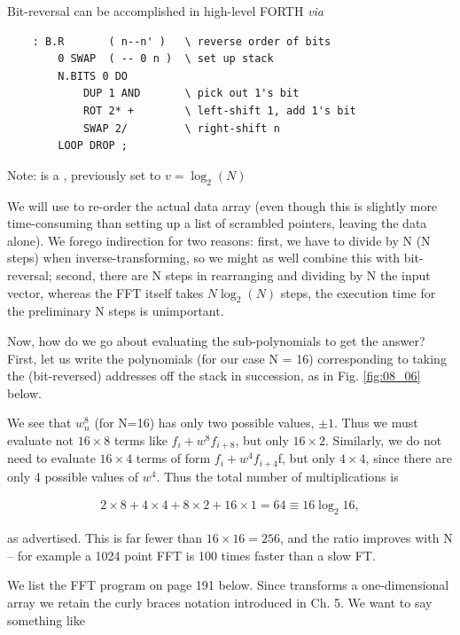 Bit-reversal can be accomplished in high-level FORTH \textit{via}

\begin{lstlisting}
    : B.R       ( n--n' )   \ reverse order of bits
        0 SWAP  ( -- 0 n )  \ set up stack
        N.BITS 0 DO
            DUP 1 AND       \ pick out 1's bit
            ROT 2* +        \ left-shift 1, add 1's bit
            SWAP 2/         \ right-shift n
        LOOP DROP ;
\end{lstlisting}

\leftbar[1\linewidth]
Note:  is a , previously set to $v = \log_{2}(N)$
\endleftbar

We will use  to re-order the actual data array (even though this is slightly more time-consuming than setting up a list of scrambled pointers, leaving the data alone). We forego indirection for two reasons: first, we have to divide by N (N steps) when inverse-transforming, so we might as well combine this with bit-reversal; second, there are N steps in rearranging and dividing by N the input vector, whereas the FFT itself takes $N\log_{2}(N)$ steps, \ie the execution time for the preliminary N steps is unimportant.

Now, how do we go about evaluating the sub-polynomials to get the answer? First, let us write the polynomials (for our case N = 16) corresponding to taking the (bit-reversed) addresses off the stack in succession, as in Fig. \ref{fig:08_06} below.



We see that $w_{n}^{8}$ (for N=16) has only two possible values, $\pm1$. Thus we must evaluate not $16\times8$ terms like $f_{i} + w^{8}f_{i+8}$, but only $16\times2$. Similarly, we do not need to evaluate $16\times4$ terms of form $f_{i} + w^{4}f_{i+4}$f, but only $4\times4$, since there are only 4 possible values of $w^{4}$. Thus the total number of multiplications is

\begin{align*}
    2\times8 + 4\times4 + 8\times2 + 16\times1 = 64 \equiv 16\log_{2}16,
\end{align*}

as advertised. This is far fewer than $16\times16=256$, and the ratio improves with N -- for example a 1024 point FFT is 100 times faster than a slow FT.

We list the FFT program on page 191 below. Since  transforms a one-dimensional array we retain the curly braces notation introduced in Ch. 5. We want to say something like

